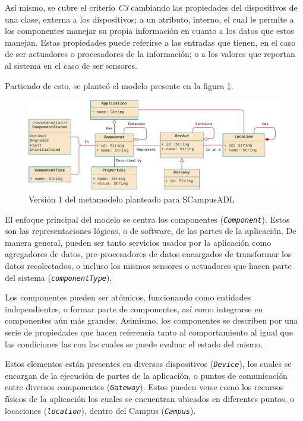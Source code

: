 Así mismo, se cubre el criterio \textit{C3} cambiando las propiedades del dispositivos de una clase, externa a los dispositivos; a un atributo, interno, el cual le permite a los componentes manejar su propia información en cuanto a los datos que estos manejan. Estas propiedades puede referirse a las entradas que tienen, en el caso de ser actuadores o procesadores de la información; o a los valores que reportan al sistema en el caso de ser sensores.

Partiendo de esto, se planteó el modelo presente en la figura \ref{fig:metamodelo}.

\begin{figure}[H]
    \centering
    \caption{Versión 1 del metamodelo planteado para SCampusADL}
    \label{fig:metamodelo}
    \vspace{2mm}
    \includegraphics[width=0.8\linewidth]{images/Metamodel B.pdf}
\end{figure}

El enfoque principal del modelo se centra los componentes (\texttt{\textit{Component}}). Estos son las representaciones lógicas, o de software, de las partes de la aplicación. De manera general, pueden ser tanto servicios usados por la aplicación como agregadores de datos, pre-procesadores de datos encargados de transformar los datos recolectados, o incluso los mismos sensores o actuadores que hacen parte del sistema (\textit{\texttt{componentType}}). 

Los componentes pueden ser atómicos, funcionando como entidades independientes, o formar parte de componentes, así como integrarse en componentes aún más grandes. Asimismo, los componentes se describen por una serie de propiedades que hacen referencia tanto al comportamiento al igual que las condiciones las con las cuales se puede evaluar el estado del mismo. 

Estos elementos están presentes en diversos dispositivos (\texttt{\textit{Device}}), los cuales se encargan de la ejecución de partes de la aplicación, o puntos de comunicación entre diversos componentes (\textit{\texttt{Gateway}}). Estos pueden verse como los recursos físicos de la aplicación los cuales se encuentran ubicados en diferentes puntos, o locaciones (\textit{\texttt{location}}), dentro del Campus (\textit{\texttt{Campus}}). 

